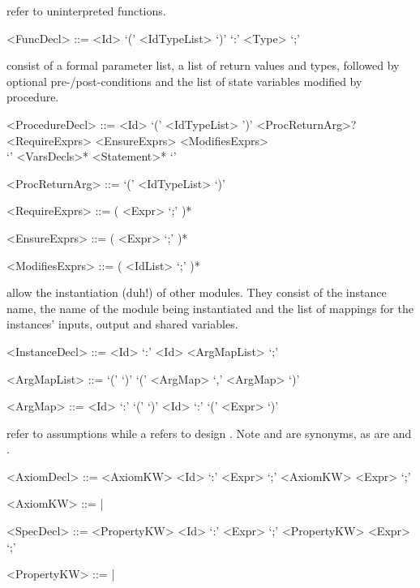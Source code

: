  refer to uninterpreted functions. 
\begin{grammar}
     <FuncDecl> ::= 
        <Id> `(' <IdTypeList> `)' `:' <Type> `;'

\end{grammar}

 consist of a formal parameter list, a list of return values and types, 
followed by optional pre-/post-conditions and the list of state variables modified by procedure.
\begin{grammar}
     <ProcedureDecl> ::=
        <Id> `(' <IdTypeList> ')' <ProcReturnArg>? \\
       <RequireExprs> <EnsureExprs> <ModifiesExprs> \\
       `{' <VarsDecls>* <Statement>* `}'

     <ProcReturnArg> ::=  `(' <IdTypeList> `)'

     <RequireExprs> ::= (  <Expr> `;' )*

     <EnsureExprs> ::= (  <Expr> `;' )*

     <ModifiesExprs> ::= (  <IdList> `;' )*

\end{grammar}

 allow the instantiation (duh!) of other modules. They consist of the instance name, the name of the module being instantiated and the list of mappings for the instances' inputs, output and shared variables. 
\begin{grammar}
     <InstanceDecl> ::=  <Id> `:' <Id> <ArgMapList> `;'

     <ArgMapList>   ::= `(' `)' 
                    \alt `(' <ArgMap> `,' <ArgMap> `)'

     <ArgMap> ::= <Id> `:' `(' `)' 
              \alt <Id> `:' `(' <Expr> `)'
             
\end{grammar}

 refer to assumptions while a  refers to design . Note  and  are synonyms, as are  and .

\begin{grammar}
     <AxiomDecl> ::= <AxiomKW> <Id> `:' <Expr> `;'
                 \alt <AxiomKW> <Expr> `;'

     <AxiomKW> ::=  | 

     <SpecDecl> ::= <PropertyKW> <Id> `:' <Expr> `;'
                 \alt <PropertyKW> <Expr> `;'

     <PropertyKW> ::=  | 
\end{grammar}

